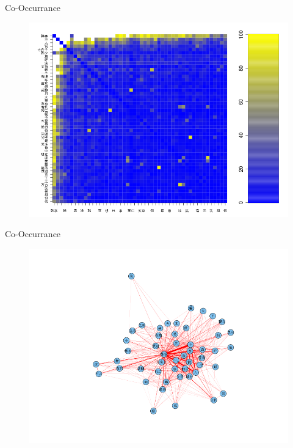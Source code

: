 \documentclass[12pt, trans]{beamer}
\newcommand{\1}[1]{{\mathbf 1}\left\{#1\right\}}        %
\begin{document}
\begin{frame}{Co-Occurrance}

\begin{figure}
  \centering
  \includegraphics[height=0.9\textheight]{./../../coocurResults/cooccurMatPlot.png} 
\end{figure}


\end{frame}

\begin{frame}{Co-Occurrance}

\begin{figure}
  \centering
  \includegraphics[height=0.9\textheight]{./../../coocurResults/cooccurNetwork.png} 
\end{figure}

\end{frame}
\end{document}
